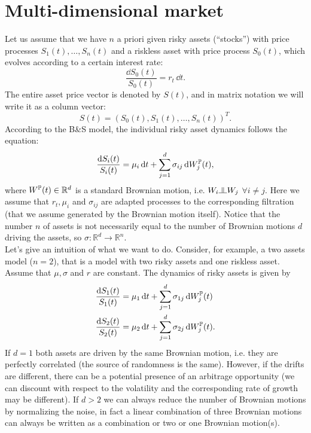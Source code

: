 \section{Multi-dimensional market} %
Let us assume that we have $n$ a priori given risky assets (“stocks”) with price processes $S_1(t),\dots,S_n(t)$ and a riskless asset with price process $S_0(t)$, which evolves according to a certain interest rate:
\begin{equation}
    \dfrac{\dd S_0(t)}{S_0(t)} = r_t\,\dd t.
\end{equation}
The entire asset price vector is denoted by $S(t)$, and in matrix notation we will write it as a column vector:
\begin{equation}
    S(t) = (S_0(t), S_1(t),\dots,S_n(t))^T.
\end{equation}
According to the B\&S model, the individual risky asset dynamics follows the equation:
\begin{equation}
    \dfrac{\dd S_i(t)}{S_i(t)} = \mu_i\,\dd t + \sum^d_{j=1}\sigma_{ij}\,\dd W_j^{\mathbb{P}}(t),
\end{equation}
where $W^{\mathbb{P}}(t)\in\mathbb{R}^d$ is a standard Brownian motion, i.e. $W_i\indep W_j$ $\forall i\ne j$. Here we assume that $r_t, \mu_i$ and $\sigma_{ij}$ are adapted processes to the corresponding filtration (that we assume generated by the Brownian motion itself). Notice that the number $n$ of assets is not necessarily equal to the number of Brownian motions $d$ driving the assets, so $\sigma:\mathbb{R}^d\to\mathbb{R}^n$.\\
Let's give an intuition of what we want to do. Consider, for example, a two assets model ($n=2$), that is a model with two risky assets and one riskless asset. Assume that $\mu,\sigma$ and $r$ are constant. The dynamics of risky assets is given by
\begin{align}\label{bm}
    \dfrac{\dd S_1(t)}{S_1(t)} &= \mu_1\,\dd t + \sum^d_{j=1}\sigma_{1j}\,\dd W_j^{\mathbb{P}}(t) \\
    \dfrac{\dd S_2(t)}{S_2(t)} &= \mu_2\,\dd t + \sum^d_{j=1}\sigma_{2j}\,\dd W_j^{\mathbb{P}}(t).
\end{align}
If $d=1$ both assets are driven by the same Brownian motion, i.e. they are perfectly correlated (the source of randomness is the same). However, if the drifts are different, there can be a potential presence of an arbitrage opportunity (we can discount with respect to the volatility and the corresponding rate of growth may be different). If $d>2$ we can always reduce the number of Brownian motions by normalizing the noise, in fact a linear combination of three Brownian motions can always be written as a combination or two or one Brownian motion(s).

